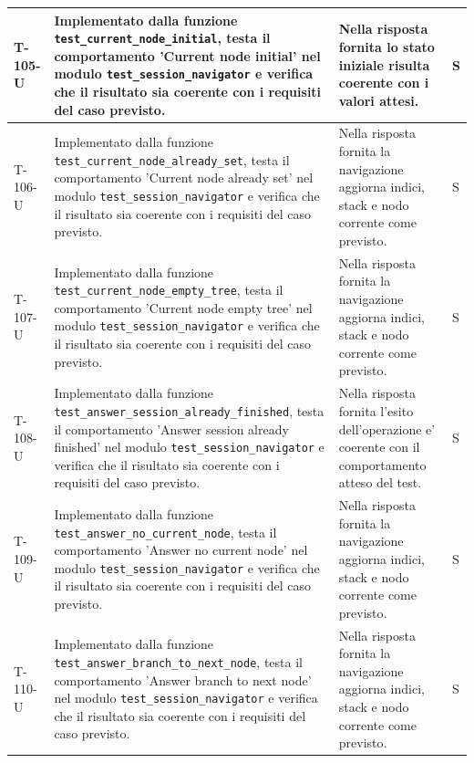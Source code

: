 \documentclass[a4paper,12pt]{article}
\begin{document}
{{\begin{longtable}{|>{\RaggedRight\arraybackslash}p{1.55cm}|>{\RaggedRight\arraybackslash}p{8.0cm}|>{\RaggedRight\arraybackslash}p{4.6cm}|>{\RaggedRight\arraybackslash}p{1.2cm}|}
        \hline
        T-105-U & Implementato dalla funzione \texttt{test\_\allowbreak current\_\allowbreak node\_\allowbreak initial}, testa il comportamento 'Current node initial' nel modulo \texttt{test\_\allowbreak session\_\allowbreak navigator} e verifica che il risultato sia coerente con i requisiti del caso previsto. & Nella risposta fornita lo stato iniziale risulta coerente con i valori attesi. & S \\
        \hline
        T-106-U & Implementato dalla funzione \texttt{test\_\allowbreak current\_\allowbreak node\_\allowbreak already\_\allowbreak set}, testa il comportamento 'Current node already set' nel modulo \texttt{test\_\allowbreak session\_\allowbreak navigator} e verifica che il risultato sia coerente con i requisiti del caso previsto. & Nella risposta fornita la navigazione aggiorna indici, stack e nodo corrente come previsto. & S \\
        \hline
        T-107-U & Implementato dalla funzione \texttt{test\_\allowbreak current\_\allowbreak node\_\allowbreak empty\_\allowbreak tree}, testa il comportamento 'Current node empty tree' nel modulo \texttt{test\_\allowbreak session\_\allowbreak navigator} e verifica che il risultato sia coerente con i requisiti del caso previsto. & Nella risposta fornita la navigazione aggiorna indici, stack e nodo corrente come previsto. & S \\
        \hline
        T-108-U & Implementato dalla funzione \texttt{test\_\allowbreak answer\_\allowbreak session\_\allowbreak already\_\allowbreak finished}, testa il comportamento 'Answer session already finished' nel modulo \texttt{test\_\allowbreak session\_\allowbreak navigator} e verifica che il risultato sia coerente con i requisiti del caso previsto. & Nella risposta fornita l'esito dell'operazione e' coerente con il comportamento atteso del test. & S \\
        \hline
        T-109-U & Implementato dalla funzione \texttt{test\_\allowbreak answer\_\allowbreak no\_\allowbreak current\_\allowbreak node}, testa il comportamento 'Answer no current node' nel modulo \texttt{test\_\allowbreak session\_\allowbreak navigator} e verifica che il risultato sia coerente con i requisiti del caso previsto. & Nella risposta fornita la navigazione aggiorna indici, stack e nodo corrente come previsto. & S \\
        \hline
        T-110-U & Implementato dalla funzione \texttt{test\_\allowbreak answer\_\allowbreak branch\_\allowbreak to\_\allowbreak next\_\allowbreak node}, testa il comportamento 'Answer branch to next node' nel modulo \texttt{test\_\allowbreak session\_\allowbreak navigator} e verifica che il risultato sia coerente con i requisiti del caso previsto. & Nella risposta fornita la navigazione aggiorna indici, stack e nodo corrente come previsto. & S \\

\end{longtable}}}
\end{document}
